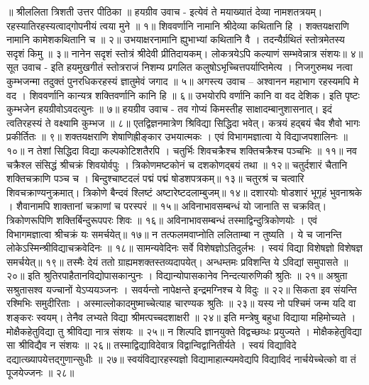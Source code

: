 ॥ श्रीललिता त्रिशती उत्तर पीठिका ॥
हयग्रीव उवाच -
इत्येवं ते मयाख्यातं देव्या नामशतत्रयम्।
रहस्यातिरहस्यत्वाद्गोपनीयं त्वया मुने ॥ १॥
शिववर्णानि नामानि श्रीदेव्या कथितानि हि ।
शक्तयक्षराणि नामानि कामेशकथितानि च ॥ २॥
उभयाक्षरनामानि ह्युभाभ्यां कथितानि वै ।
तदन्यैर्ग्रथितं स्तोत्रमेतस्य सदृशं किमु ॥ ३॥
नानेन सदृशं स्तोत्रं श्रीदेवी प्रीतिदायकम्।
लोकत्रयेऽपि कल्याणं सम्भवेन्नात्र संशयः॥ ४॥
सूत उवाच -
इति हयमुखगीतं स्तोत्रराजं निशम्य
प्रगलित कलुषोऽभृच्चित्तपर्याप्तिमेत्य ।
निजगुरुमथ नत्वा कुम्भजन्मा तदुक्तं
पुनरधिकरहस्यं ज्ञातुमेवं जगाद ॥ ५॥
अगस्त्य उवाच –
अश्वानन महाभाग रहस्यमपि मे वद ।
शिववर्णानि कान्यत्र शक्तिवर्णानि कानि हि ॥ ६॥
उभयोरपि वर्णानि कानि वा वद देशिक।
इति पृष्टः कुम्भजेन हयग्रीवोऽवदत्युनः ॥ ७॥
हयग्रीव उवाच -
तव गोप्यं किमस्तीह साक्षादम्बानुशासनात्।
इदं त्वतिरहस्यं ते वक्ष्यामि कुम्भज ॥ ८॥
एतद्विज्ञनमात्रेण श्रिविद्या सिद्धिदा भवेत्।
कत्रयं हद्बयं चैव शैवो भागः प्रकीर्तितः ॥ ९॥
शक्तयक्षराणि शेषाणिह्रीङ्कार उभयात्मकः ।
एवं विभागमज्ञात्वा ये विद्याजपशालिनः ॥ १०॥
न तेशां सिद्धिदा विद्या कल्पकोटिशतैरपि ।
चतुर्भिः शिवचक्रैश्च शक्तिचक्रैश्च पञ्चभिः ॥ ११॥
नव चक्रैश्ल संसिद्धं श्रीचक्रं शिवयोर्वपुः ।
त्रिकोणमष्टकोनं च दशकोणद्बयं तथा ॥ १२॥
चतुर्दशारं चैतानि शक्तिचक्राणि पञ्च च ।
बिन्दुश्चाष्टदलं पद्मं पद्मं षोडशपत्रकम्॥ १३॥
चतुरश्रं च चत्वारि शिवचक्राण्यनुक्रमात्।
त्रिकोणे बैन्दवं श्लिष्टं अष्टारेष्टदलाम्बुजम्॥ १४॥
दशारयोः षोडशारं भूगृहं भुवनाश्रके ।
शैवानामपि शाक्तानां चक्राणां च परस्परं ॥ १५॥
अविनाभावसम्बन्धं यो जानाति स चक्रवित्।
त्रिकोणरूपिणि शक्तिर्बिन्दुरूपपरः शिवः ॥ १६॥
अविनाभावसम्बन्धं तस्माद्विन्दुत्रिकोणयोः ।
एवं विभागमज्ञात्वा श्रीचक्रं यः समर्चयेत्॥ १७॥
न तत्फलमवाप्नोति ललिताम्बा न तुष्यति ।
ये च जानन्ति लोकेऽस्मिन्श्रीविद्याचक्रवेदिनः ॥ १८॥
सामन्यवेदिनः सर्वे विशेषज्ञोऽतिदुर्लभः ।
स्वयं विद्या विशेषज्ञो विशेषज्ञ समर्चयेत्॥ १९॥
तस्मैः देयं ततो ग्राह्यमशक्तस्तव्यदापयेत्।
अन्धम्तमः प्रविशन्ति ये ऽविद्यां समुपासते ॥ २०॥
इति श्रुतिरपाहैतानविद्योपासकान्पुनः ।
विद्यान्योपासकानेव निन्दत्यारुणिकी श्रुतिः ॥ २१॥
अश्रुता सश्रुतासश्व यज्चानों येऽप्ययञ्जनः ।
सवर्यन्तो नापेक्षन्ते इन्द्रमग्निश्च ये विदुः ॥ २२॥
सिकता इव संयन्ति रश्मिभिः समुदीरिताः ।
अस्माल्लोकादमुष्माच्चेत्याह चारण्यक श्रुतिः ॥ २३॥
यस्य नो पश्चिमं जन्म यदि वा शङ्करः स्वयम्।
तेनैव लभ्यते विद्या श्रीमत्पच्चदशाक्षरी ॥ २४॥
इति मन्त्रेषु बहुधा विद्याया महिमोच्यते ।
मोक्षैकहेतुविद्या तु श्रीविद्या नात्र संशयः ॥ २५॥
न शिल्पदि ज्ञानयुक्ते विद्वच्छव्धः प्रयुज्यते ।
मोक्षैकहेतुविद्या सा श्रीविद्यैव न संशयः ॥ २६॥
तस्माद्विद्याविदेवात्र विद्वान्विद्वानितीर्यते ।
स्वयं विद्याविदे दद्यात्ख्यापयेत्तद्गुणान्सुधीः ॥ २७॥
स्वयंविद्यारहस्यज्ञो विद्यामाहात्म्यमवेद्यपि
विद्याविदं नार्चयेच्चेत्को वा तं पूजयेज्जनः ॥ २८॥
